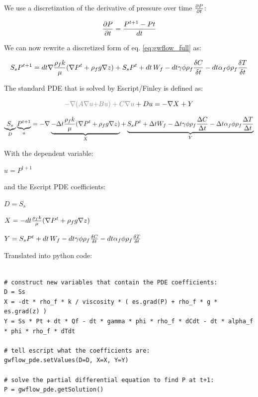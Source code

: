 \documentclass[11pt]{article}
\begin{document}
We use a discretization of the derivative of pressure over time ${\partial P \over{\partial t} }$:

\begin{equation}
    {\partial P \over{\partial t}} = { P^{t+1} - P{t} \over{d t} }
\end{equation}

We can now rewrite a discretized form of eq. \ref{eq:gwflow_full} as:

\begin{equation}
 	S_{s} P^{t+1}  = dt \nabla { \rho_f k \over{\mu} } (\nabla  P^t + \rho_f g \nabla z) + S_s P^t + dt\,W_f - dt \gamma \phi \rho_f { \delta C \over{\delta t} } - dt \alpha_f \phi \rho_f {\delta T \over{\delta t} }
\end{equation}

The standard PDE that is solved by Escript/Finley is defined as:

\begin{equation}
    {\color{gray} - \nabla (A \nabla u {\color{gray}+ B u }) +  C \nabla u }  + D u  = - \nabla X + Y
\end{equation}

\begin{equation}
 	\underbrace{S_s}_D \underbrace{P^{t+1}}_u  = - \nabla \underbrace{ -\Delta t { \rho_f k \over{\mu} } (\nabla  P^t + \rho_f g \nabla z) }_X + \underbrace{ S_s P^t + \Delta t W_f - \Delta t \gamma \phi \rho_f { \Delta C \over{\Delta t} } - \Delta t \alpha_f \phi \rho_f {\Delta T \over{\Delta t} } }_Y
\end{equation}

With the dependent variable:

$ u = P^{t+1} $

and the Escript PDE coefficients:

$ D = S_s $

$ X = - dt { \rho_f k \over{\mu} } (\nabla  P^t + \rho_f g \nabla z) $

$ Y = S_s P^t + dt\,W_f - dt \gamma \phi \rho_f { \delta C \over{\delta t} } - dt \alpha_f \phi \rho_f {\delta T \over{\delta t} }  $


Translated into python code:

\begin{verbatim}

# construct new variables that contain the PDE coefficients:
D = Ss
X = -dt * rho_f * k / viscosity * ( es.grad(P) + rho_f * g * es.grad(z) )
Y = Ss * Pt + dt * Qf - dt * gamma * phi * rho_f * dCdt - dt * alpha_f * phi * rho_f * dTdt 

# tell escript what the coefficients are:
gwflow_pde.setValues(D=D, X=X, Y=Y)

# solve the partial differential equation to find P at t+1:
P = gwflow_pde.getSolution()

\end{verbatim}
\end{document}
